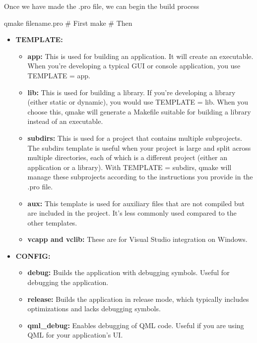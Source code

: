 \documentclass{report}
\begin{document}
    \bigbreak \noindent 
    \bigbreak \noindent 
    Once we have made the .pro file, we can begin the build process
    \bigbreak \noindent 
    \begin{bashcode}
qmake filename.pro # First
make # Then
    \end{bashcode}

    \pagebreak
    \begin{itemize}
        \item \textbf{TEMPLATE:} 
            \begin{itemize}
                \item \textbf{app:} This is used for building an application. It will create an executable. When you're developing a typical GUI or console application, you use TEMPLATE = app.
                \item \textbf{lib:} This is used for building a library. If you're developing a library (either static or dynamic), you would use TEMPLATE = lib. When you choose this, qmake will generate a Makefile suitable for building a library instead of an executable.
                \item \textbf{subdirs:} This is used for a project that contains multiple subprojects. The subdirs template is useful when your project is large and split across multiple directories, each of which is a different project (either an application or a library). With TEMPLATE = subdirs, qmake will manage these subprojects according to the instructions you provide in the .pro file.
                \item \textbf{aux:} This template is used for auxiliary files that are not compiled but are included in the project. It's less commonly used compared to the other templates.
                \item \textbf{vcapp and vclib:} These are for Visual Studio integration on Windows.
            \end{itemize}
        \item \textbf{CONFIG:}
            \begin{itemize}
                \item \textbf{debug:} Builds the application with debugging symbols. Useful for debugging the application.
                \item \textbf{release:} Builds the application in release mode, which typically includes optimizations and lacks debugging symbols.
                \item \textbf{qml\_debug:} Enables debugging of QML code. Useful if you are using QML for your application's UI.

\end{itemize}
\end{itemize}
\end{document}
